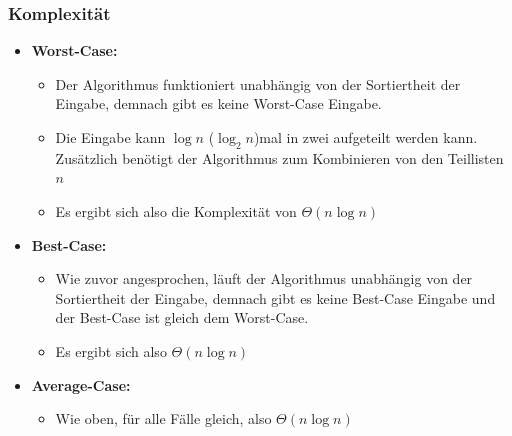 \documentclass[
../AuD-Zusammenfassung.tex,
]
{subfiles}
\begin{document}
\subsubsection{Komplexität}
\begin{itemize}
    \item \textbf{Worst-Case:}
    \begin{itemize}
        \item Der Algorithmus funktioniert unabhängig von der Sortiertheit der Eingabe, demnach gibt es keine Worst-Case Eingabe. 
        \item Die Eingabe kann $\log n$ ($\log_2 n$)mal in zwei aufgeteilt werden kann. Zusätzlich benötigt der Algorithmus zum Kombinieren von den Teillisten $n$
        \item Es ergibt sich also die Komplexität von $\Theta(n\log n)$
    \end{itemize}
    \item \textbf{Best-Case:}
    \begin{itemize}
        \item Wie zuvor angesprochen, läuft der Algorithmus unabhängig von der Sortiertheit der Eingabe, demnach gibt es keine Best-Case Eingabe und der Best-Case ist gleich dem Worst-Case.
        \item Es ergibt sich also $\Theta(n\log n)$
    \end{itemize}
    \item \textbf{Average-Case:}
    \begin{itemize}
        \item Wie oben, für alle Fälle gleich, also $\Theta(n\log n)$ 
    \end{itemize}
\end{itemize}

\end{document}
